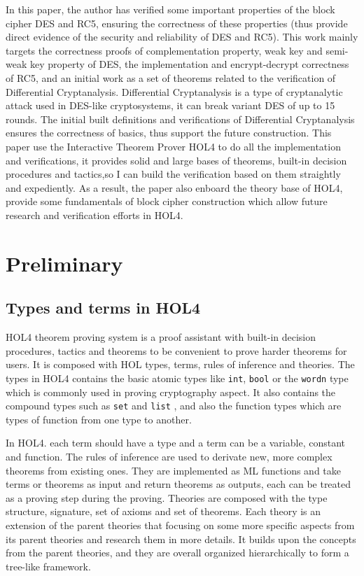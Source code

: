 \documentclass{article}
\begin{document}
In this paper, the author has verified some important properties
of the block cipher DES and RC5, ensuring the correctness of these
properties (thus provide
direct evidence of the security and reliability of DES and RC5).
This work mainly targets the correctness proofs of complementation property,
weak key and semi-weak key property of DES, the implementation and
encrypt-decrypt correctness of RC5, and an initial work as a set of
theorems related to the verification
of Differential Cryptanalysis. Differential Cryptanalysis is a type of cryptanalytic attack used in DES-like
cryptosystems, it can break variant DES of up to 15 rounds. The initial built definitions and verifications of
Differential Cryptanalysis ensures the correctness of basics, thus support the future construction. This paper
use the Interactive Theorem Prover HOL4 to do all the implementation and verifications, it provides solid and
large bases of theorems, built-in decision procedures and tactics,so I can build the verification based on them
straightly and expediently. As a result, the paper also enboard the theory base of HOL4, provide some
fundamentals of block cipher construction which allow future research and verification efforts in HOL4.

\section{Preliminary}

\subsection{Types and terms in HOL4}
HOL4 theorem proving system is a proof assistant with built-in decision procedures\cite{HOL4}, tactics and theorems to
be convenient to prove harder theorems for users. It is composed with HOL types, terms, rules of inference
and theories. The types in HOL4 contains the basic atomic types like \verb|int|, \verb|bool| or the \verb|wordn| type which
is commonly used in proving cryptography aspect. It also contains the compound types such as \verb|set| and \verb|list|
, and also the function types which are types of function from one type to another.

In HOL4. each term should
have a type and a term can be a variable, constant and function. The rules of inference are used to derivate
new, more complex theorems from existing ones. They are implemented as ML functions and take terms or theorems
as input and return theorems as outputs, each can be treated as a proving step during the proving. Theories are
composed with the type structure, signature, set of axioms and set of theorems. Each theory is an extension of
the parent theories that focusing on some more specific aspects from its parent theories and research them in
more details. It builds upon the concepts from the parent theories, and they are overall organized hierarchically
to form a tree-like framework.
\end{document}

